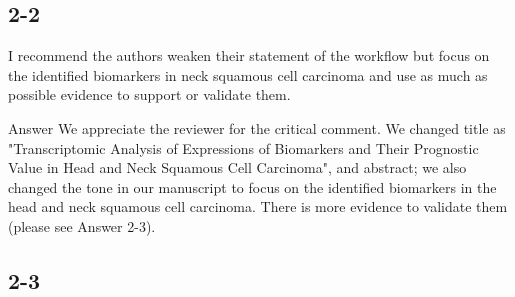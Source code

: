\documentclass[preprint,12pt]{elsarticle}
\newenvironment{MyColorPar}[1]{%
    \leavevmode\color{#1}\ignorespaces%
}{%
}%
\begin{document}




%
\clearpage
\subsection*{2-2}
I recommend the authors weaken their statement of the workflow but focus on the identified biomarkers in neck squamous cell carcinoma and use as much as possible evidence to support or validate them. %


%
\begin{MyColorPar}{blue}
Answer
We appreciate the reviewer for the critical comment.
We changed title as "Transcriptomic Analysis of Expressions of Biomarkers and Their Prognostic Value in Head and Neck Squamous Cell Carcinoma", and abstract; we also changed the tone in our manuscript to focus on the identified biomarkers in the head and neck squamous cell carcinoma.
There is more evidence to validate them (please see Answer 2-3).

%
\end{MyColorPar}



\subsection*{2-3}
\end{document}
